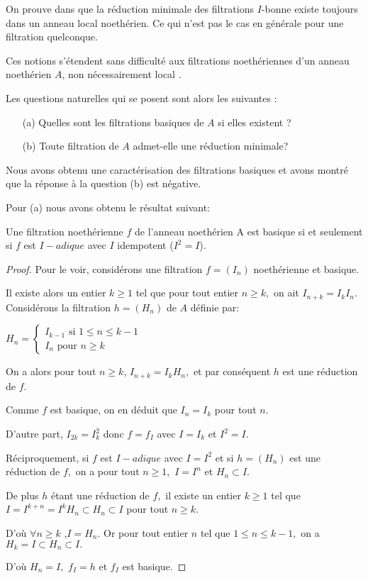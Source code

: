 \begin{maremarque}
	On prouve dans \cite{Di2} que la réduction minimale des filtrations $I$-bonne existe toujours dans un anneau local noethérien. Ce qui n'est pas le cas en générale pour une filtration quelconque.
\end{maremarque}
Ces notions s'étendent sans difficulté aux filtrations noethériennes d'un anneau noethérien $A$, non nécessairement local \cite{Di2}. 

Les questions naturelles qui se posent sont alors les suivantes :
\begin{enumerate}
	\item[(a)] Quelles sont les filtrations basiques de $A$ si elles existent ?
	\item[(b)] Toute filtration de $A$ admet-elle une réduction minimale?
\end{enumerate}

Nous avons obtenu une caractérisation des filtrations basiques et avons montré que la réponse à la question (b) est négative.

Pour (a) nous avons obtenu le résultat suivant:
\begin{maproposition}
	Une filtration noethérienne $f $ de l'anneau noethérien A est basique si et seulement si $f$ est $I-adique$ avec $I$ idempotent ($I^{2}=I$).
\end{maproposition}
\begin{proof}
	Pour le voir, considérons une filtration $f=(I_{n})$ noethérienne et basique. 
	
	Il existe alors un entier $k\geq 1$ tel que pour tout entier $n\geq k,$ on
	ait $I_{n+k}=I_{k}I_{n}.$ Considérons la filtration $h=(H_{n})$ de $A$ définie par:
	
	$H_{n}=\left\{ 
	\begin{array}{c}
		I_{k-1}\text{ si }1\leq n\leq k-1 \\ 
		I_{n}\text{ pour }n\geq k
	\end{array}
	\right. $ 
	
	On a alors pour tout $n\geq k$, $I_{n+k}=I_{k}H_{n},$ et par conséquent $h$ est une réduction de $f.$
	
	Comme $f$ est basique, on en déduit que $I_{n}=I_{k}$ pour tout $n.$
	
	D'autre part, $I_{2k}=I_{k}^{2}$ donc $f=f_{I}$ avec $I=I_{k}$ et $I^{2}=I.$
	
	Réciproquement, si $f$ est $I-adique$ avec $I=I^{2}$ et si $h=(H_{n})$ est une réduction de $f,$ on a pour tout $n\geq 1,$ $I=I^{n}$ et $
	H_{n}\subset I.$
	
	De plus $h$ étant une réduction de $f,$ il existe un entier $k\geq 1$
	tel que $I=I^{k+n}=I^{k}H_{n}\subset H_{n}\subset I$ pour tout $n\geq k.$
	
	D'où $\forall n\geq k$ ,$I=H_{n}.$ Or pour tout entier $n$ tel que $1\leq n\leq k-1,$ on a $H_{k}=I\subset H_{n}\subset I.$
	
	D'où $H_{n}=I,$ $f_{I}=h$ et $f_{I}$ est basique.
\end{proof}

